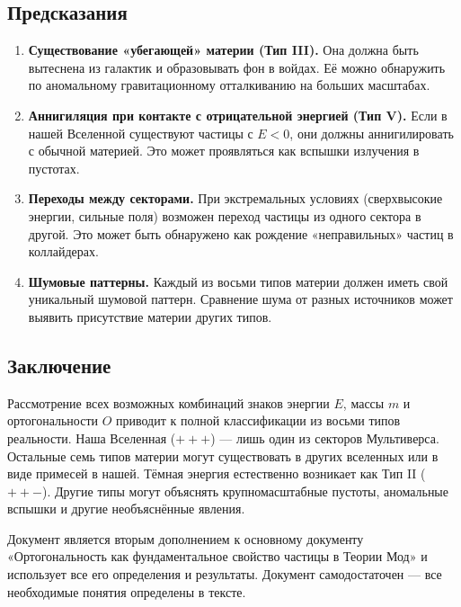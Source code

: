\documentclass[12pt,a4paper]{article}
\begin{document}
\subsection{Предсказания}
\begin{enumerate}[label=\arabic*.]
    \item \textbf{Существование «убегающей» материи (Тип III).} Она должна быть вытеснена из галактик и образовывать фон в войдах. Её можно обнаружить по аномальному гравитационному отталкиванию на больших масштабах.
    \item \textbf{Аннигиляция при контакте с отрицательной энергией (Тип V).} Если в нашей Вселенной существуют частицы с $E < 0$, они должны аннигилировать с обычной материей. Это может проявляться как вспышки излучения в пустотах.
    \item \textbf{Переходы между секторами.} При экстремальных условиях (сверхвысокие энергии, сильные поля) возможен переход частицы из одного сектора в другой. Это может быть обнаружено как рождение «неправильных» частиц в коллайдерах.
    \item \textbf{Шумовые паттерны.} Каждый из восьми типов материи должен иметь свой уникальный шумовой паттерн. Сравнение шума от разных источников может выявить присутствие материи других типов.
\end{enumerate}

\subsection{Заключение}
Рассмотрение всех возможных комбинаций знаков энергии $E$, массы $m$ и ортогональности $O$ приводит к полной классификации из восьми типов реальности. Наша Вселенная ($+ + +$) --- лишь один из секторов Мультиверса. Остальные семь типов материи могут существовать в других вселенных или в виде примесей в нашей. Тёмная энергия естественно возникает как Тип II ($+ + -$). Другие типы могут объяснять крупномасштабные пустоты, аномальные вспышки и другие необъяснённые явления.

Документ является вторым дополнением к основному документу «Ортогональность как фундаментальное свойство частицы в Теории Мод» и использует все его определения и результаты. Документ самодостаточен --- все необходимые понятия определены в тексте.

\end{document}
